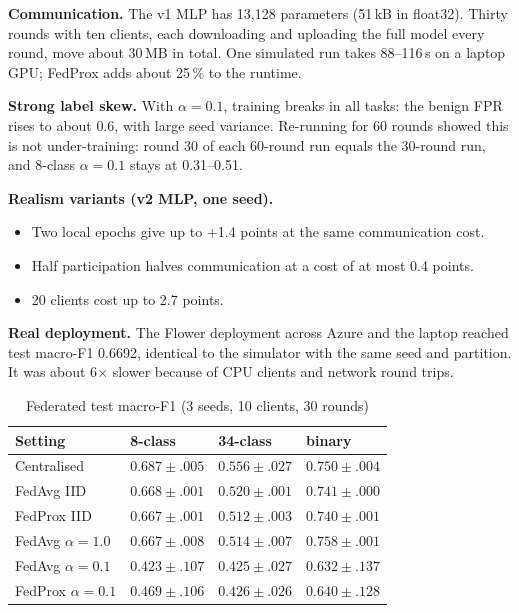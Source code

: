 \documentclass[conference]{IEEEtran}
\begin{document}
\textbf{Communication.} The v1 MLP has 13,128 parameters (51\,kB in float32). Thirty rounds with ten clients, each downloading and uploading the full model every round, move about 30\,MB in total. One simulated run takes 88--116\,s on a laptop GPU; FedProx adds about 25\,\% to the runtime.

\textbf{Strong label skew.} With $\alpha=0.1$, training breaks in all tasks: the benign FPR rises to about 0.6, with large seed variance. Re-running for 60 rounds showed this is not under-training: round 30 of each 60-round run equals the 30-round run, and 8-class $\alpha=0.1$ stays at 0.31--0.51.

\textbf{Realism variants (v2 MLP, one seed).}
\begin{itemize}
\item Two local epochs give up to +1.4 points at the same communication cost.
\item Half participation halves communication at a cost of at most 0.4 points.
\item 20 clients cost up to 2.7 points.
\end{itemize}

\textbf{Real deployment.} The Flower deployment across Azure and the laptop reached test macro-F1 0.6692, identical to the simulator with the same seed and partition. It was about 6$\times$ slower because of CPU clients and network round trips.

\begin{table}[t]
\caption{Federated test macro-F1 (3 seeds, 10 clients, 30 rounds)}\label{tab:fl}
\centering\footnotesize
\setlength{\tabcolsep}{3pt}
\begin{tabular}{@{}llll@{}}
\toprule
Setting & 8-class & 34-class & binary \\
\midrule
Centralised & $0.687\pm.005$ & $0.556\pm.027$ & $0.750\pm.004$ \\
FedAvg IID & $0.668\pm.001$ & $0.520\pm.001$ & $0.741\pm.000$ \\
FedProx IID & $0.667\pm.001$ & $0.512\pm.003$ & $0.740\pm.001$ \\
FedAvg $\alpha{=}1.0$ & $0.667\pm.008$ & $0.514\pm.007$ & $0.758\pm.001$ \\
FedAvg $\alpha{=}0.1$ & $0.423\pm.107$ & $0.425\pm.027$ & $0.632\pm.137$ \\
FedProx $\alpha{=}0.1$ & $0.469\pm.106$ & $0.426\pm.026$ & $0.640\pm.128$ \\
\bottomrule
\end{tabular}
\end{table}
\end{document}
